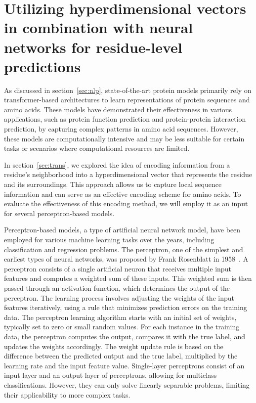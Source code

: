 \chapter{Utilizing hyperdimensional vectors in combination with neural networks for residue-level predictions}
As discussed in section~\ref{sec:nlp}, state-of-the-art protein models primarily rely on transformer-based architectures to learn representations of protein sequences and amino acids. These models have demonstrated their effectiveness in various applications, such as protein function prediction and protein-protein interaction prediction, by capturing complex patterns in amino acid sequences. However, these models are computationally intensive and may be less suitable for certain tasks or scenarios where computational resources are limited.

In section~\ref{sec:trans}, we explored the idea of encoding information from a residue's neighborhood into a hyperdimensional vector that represents the residue and its surroundings. This approach allows us to capture local sequence information and can serve as an effective encoding scheme for amino acids. To evaluate the effectiveness of this encoding method, we will employ it as an input for several perceptron-based models.

Perceptron-based models, a type of artificial neural network model, have been employed for various machine learning tasks over the years, including classification and regression problems. The perceptron, one of the simplest and earliest types of neural networks, was proposed by Frank Rosenblatt in 1958~\cite{perceptron}. A perceptron consists of a single artificial neuron that receives multiple input features and computes a weighted sum of these inputs. This weighted sum is then passed through an activation function, which determines the output of the perceptron. The learning process involves adjusting the weights of the input features iteratively, using a rule that minimizes prediction errors on the training data. The perceptron learning algorithm starts with an initial set of weights, typically set to zero or small random values. For each instance in the training data, the perceptron computes the output, compares it with the true label, and updates the weights accordingly. The weight update rule is based on the difference between the predicted output and the true label, multiplied by the learning rate and the input feature value. Single-layer perceptrons consist of an input layer and an output layer of perceptrons, allowing for multiclass classifications. However, they can only solve linearly separable problems, limiting their applicability to more complex tasks.

